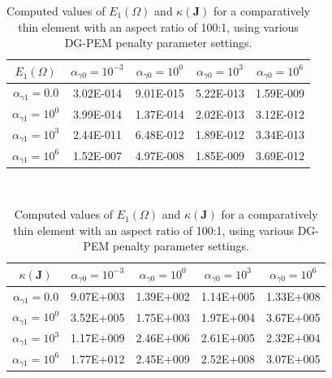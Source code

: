 \begin{table}
\centering
\begin{subtable}{1.0\textwidth}
\centering
\begin{tabular}{| c || c | c | c | c |}
    \hline
$E_1 (\Omega)$ & $\alpha_{\gamma0} = 10^{-3}$ & $\alpha_{\gamma0} = 10^{0}$ & $\alpha_{\gamma0} = 10^{3}$ & $\alpha_{\gamma0} = 10^{6}$ \\ \hline \hline
$\alpha_{\gamma1} = 0.0$	& 3.02E-014 & 9.01E-015 & 5.22E-013 & 1.59E-009 \\ \hline
$\alpha_{\gamma1} = 10^{0}$ & 3.99E-014 & 1.37E-014 & 2.02E-013 & 3.12E-012 \\ \hline
$\alpha_{\gamma1} = 10^{3}$ & 2.44E-011 & 6.48E-012 & 1.89E-012 & 3.34E-013 \\ \hline
$\alpha_{\gamma1} = 10^{6}$ & 1.52E-007 & 4.97E-008 & 1.85E-009 & 3.69E-012 \\
    \hline
    \end{tabular}
    \caption{Interpolation error: $E_1 (\Omega)$}
    \label{tab:thin_interpolation_error_k1}
\end{subtable}%
\\
\begin{subtable}{1.0\textwidth}
\centering
\begin{tabular}{| c || c | c | c | c |}
    \hline
$\kappa(\mathbf{J})$ & $\alpha_{\gamma0} = 10^{-3}$	&	$\alpha_{\gamma0} = 10^{0}$	&	$\alpha_{\gamma0} = 10^{3}$	&	$\alpha_{\gamma0} = 10^{6}$ \\ \hline \hline
$\alpha_{\gamma1} = 0.0$	& 9.07E+003 & 1.39E+002 & 1.14E+005 & 1.33E+008 \\ \hline
$\alpha_{\gamma1} = 10^{0}$	& 3.52E+005 & 1.75E+003 & 1.97E+004 & 3.67E+005 \\ \hline
$\alpha_{\gamma1} = 10^{3}$	& 1.17E+009 & 2.46E+006 & 2.61E+005 & 2.32E+004 \\ \hline
$\alpha_{\gamma1} = 10^{6}$	& 1.77E+012 & 2.45E+009 & 2.52E+008 & 3.07E+005 \\
    \hline
    \end{tabular}
    \caption{DG-PEM linear system conditioning: $\kappa(\mathbf{J})$}
    \label{tab:thin_condJ_k1}
\end{subtable}

\caption{Computed values of $E_1 (\Omega)$ and $\kappa(\mathbf{J})$ for a comparatively thin element with an aspect ratio of 100:1, using various DG-PEM penalty parameter settings.}
\label{tab:thin_interpolation_error_and_condJ_k1}
\end{table}

